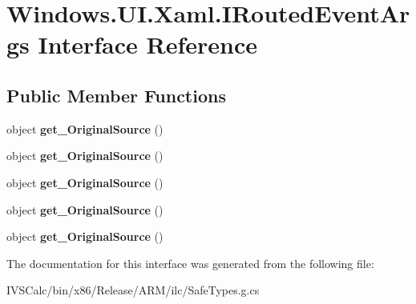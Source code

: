 \hypertarget{interface_windows_1_1_u_i_1_1_xaml_1_1_i_routed_event_args}{}\section{Windows.\+U\+I.\+Xaml.\+I\+Routed\+Event\+Args Interface Reference}
\label{interface_windows_1_1_u_i_1_1_xaml_1_1_i_routed_event_args}
\subsection*{Public Member Functions}
\begin{DoxyCompactItemize}
\item 
\mbox{\label{interface_windows_1_1_u_i_1_1_xaml_1_1_i_routed_event_args_a1f9eb32deb0126d3b0c01bc702d3b31d}} 
object {\bfseries get\+\_\+\+Original\+Source} ()
\item 
\mbox{\label{interface_windows_1_1_u_i_1_1_xaml_1_1_i_routed_event_args_a1f9eb32deb0126d3b0c01bc702d3b31d}} 
object {\bfseries get\+\_\+\+Original\+Source} ()
\item 
\mbox{\label{interface_windows_1_1_u_i_1_1_xaml_1_1_i_routed_event_args_a1f9eb32deb0126d3b0c01bc702d3b31d}} 
object {\bfseries get\+\_\+\+Original\+Source} ()
\item 
\mbox{\label{interface_windows_1_1_u_i_1_1_xaml_1_1_i_routed_event_args_a1f9eb32deb0126d3b0c01bc702d3b31d}} 
object {\bfseries get\+\_\+\+Original\+Source} ()
\item 
\mbox{\label{interface_windows_1_1_u_i_1_1_xaml_1_1_i_routed_event_args_a1f9eb32deb0126d3b0c01bc702d3b31d}} 
object {\bfseries get\+\_\+\+Original\+Source} ()
\end{DoxyCompactItemize}


The documentation for this interface was generated from the following file\+:\begin{DoxyCompactItemize}
\item 
I\+V\+S\+Calc/bin/x86/\+Release/\+A\+R\+M/ilc/Safe\+Types.\+g.\+cs\end{DoxyCompactItemize}

